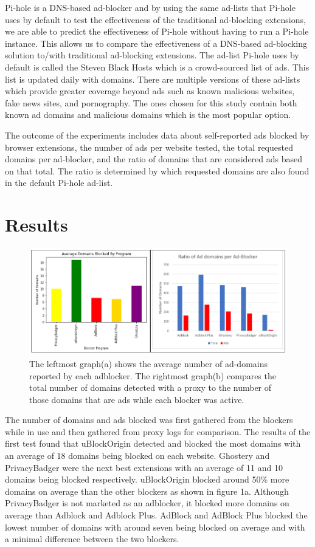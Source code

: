\documentclass[sigsmall]{acmart}
\begin{document}
Pi-hole is a DNS-based ad-blocker and by using the same ad-lists that Pi-hole uses by default to test the effectiveness of the traditional ad-blocking extensions, we are able to predict the effectiveness of Pi-hole without having to run a Pi-hole instance. This allows us to compare the effectiveness of a DNS-based ad-blocking solution to/with traditional ad-blocking extensions. The ad-list Pi-hole uses by default is called the Steven Black Hosts which is a crowd-sourced list of ads. This list is updated daily with domains. There are multiple versions of these ad-lists which provide greater coverage beyond ads such as known malicious websites, fake news sites, and pornography. The ones chosen for this study contain both known ad domains and malicious domains which is the most popular option.

The outcome of the experiments includes data about self-reported ads blocked by browser extensions, the number of ads per website tested, the total requested domains per ad-blocker, and the ratio of domains that are considered ads based on that total. The ratio is determined by which requested domains are also found in the default Pi-hole ad-list.

\section*{Results}
\begin{figure}[h!]
  \includegraphics[scale = 0.75]{Edit3.png}
  \caption{ The leftmost graph(a) shows the average number of ad-domains reported by each adblocker. The rightmost graph(b) compares the total number of domains detected with a proxy to the number of those domains that are ads while each blocker was active.}
  \label{fig:graph1ab}
\end{figure}

The number of domains and ads blocked was first gathered from the blockers while in use and then gathered from proxy logs for comparison. The results of the first test found that uBlockOrigin detected and blocked the most domains with an average of 18 domains being blocked on each website. Ghostery and PrivacyBadger were the next best extensions with an average of 11 and 10 domains being blocked respectively. uBlockOrigin blocked around 50\% more domains on average than the other blockers as shown in figure 1a. Although PrivacyBadger is not marketed as an adblocker, it blocked more domains on average than Adblock and Adblock Plus.
AdBlock and AdBlock Plus blocked the lowest number of domains with around seven being blocked on average and with a minimal difference between the two blockers.
\end{document}
